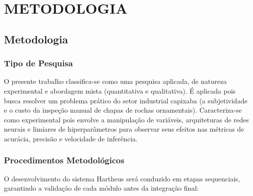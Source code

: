 \chapter[METODOLOGIA]{METODOLOGIA}

\section{Metodologia}

\subsection{Tipo de Pesquisa}
O presente trabalho classifica-se como uma pesquisa aplicada, de natureza experimental e abordagem mista (quantitativa e qualitativa). É aplicada pois busca resolver um problema prático do setor industrial capixaba (a subjetividade e o custo da inspeção manual de chapas de rochas ornamentais). Caracteriza-se como experimental pois envolve a manipulação de variáveis, arquiteturas de redes neurais e limiares de hiperparâmetros para observar seus efeitos nas métricas de acurácia, precisão e velocidade de inferência.

\subsection{Procedimentos Metodológicos}
O desenvolvimento do sistema Hartheus será conduzido em etapas sequenciais, garantindo a validação de cada módulo antes da integração final:

